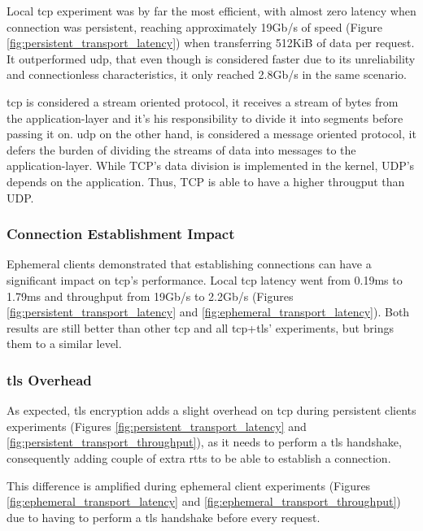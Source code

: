 Local \gls{tcp} experiment was by far the most efficient, with almost zero latency when connection was persistent, reaching approximately 19Gb/s of speed (Figure \ref{fig:persistent_transport_latency}) when transferring 512KiB of data per request. It outperformed \gls{udp}, that even though is considered faster due to its unreliability and connectionless characteristics, it only reached 2.8Gb/s in the same scenario. 

\gls{tcp} is considered a stream oriented protocol, it receives a stream of bytes from the application-layer and it's his responsibility to divide it into segments before passing it on. \gls{udp} on the other hand, is considered a message oriented protocol, it defers the burden of dividing the streams of data into messages to the application-layer. While TCP's data division is implemented in the kernel, UDP's depends on the application. Thus, TCP is able to have a higher througput than UDP.

\subsubsection*{Connection Establishment Impact}

Ephemeral clients demonstrated that establishing connections can have a significant impact on \gls{tcp}’s performance. Local \gls{tcp} latency went from 0.19ms to 1.79ms and throughput from 19Gb/s to 2.2Gb/s (Figures \ref{fig:persistent_transport_latency} and \ref{fig:ephemeral_transport_latency}). Both results are still better than other \gls{tcp} and all \gls{tcp}+\gls{tls}’ experiments, but brings them to a similar level.

\subsubsection*{\gls{tls} Overhead}

As expected, \gls{tls} encryption adds a slight overhead on \gls{tcp} during persistent clients experiments (Figures \ref{fig:persistent_transport_latency} and \ref{fig:persistent_transport_throughput}), as it needs to perform a \gls{tls} handshake, consequently adding couple of extra \gls{rtt}s to be able to establish a connection. 

This difference is amplified during ephemeral client experiments (Figures \ref{fig:ephemeral_transport_latency} and \ref{fig:ephemeral_transport_throughput}) due to having to perform a \gls{tls} handshake before every request.

